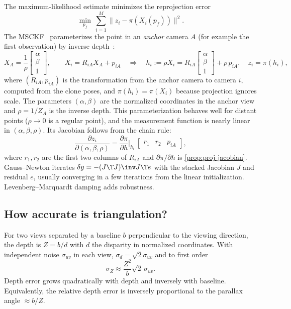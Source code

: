 The maximum-likelihood estimate minimizes the reprojection error
\begin{equation}
  \min_{p_f}\ \sum_{i=1}^M \big\| z_i - \pi(X_i(p_f)) \big\|^2 .
\end{equation}
The MSCKF~\cite{mourikis2007msckf} parameterizes the point in an \emph{anchor} camera $A$ (for example the first observation)
by inverse depth~\cite{civera2008inverse}:
\begin{equation}
  X_A = \frac1\rho\begin{bmatrix} \alpha \\ \beta \\ 1 \end{bmatrix}, \qquad
  X_i = R_{iA}X_A + p_{iA}
  \quad\Longrightarrow\quad
  h_i := \rho X_i = R_{iA}\begin{bmatrix}\alpha\\ \beta\\ 1\end{bmatrix} + \rho\,p_{iA}, \quad z_i = \pi(h_i),
\end{equation}
where $(R_{iA}, p_{iA})$ is the transformation from the anchor camera to camera $i$, computed from the clone poses, and
$\pi(h_i) = \pi(X_i)$ because projection ignores scale. The parameters $(\alpha, \beta)$ are the normalized coordinates in
the anchor view and $\rho = 1/Z_A$ is the inverse depth. This parameterization behaves well for distant points
($\rho\to0$ is a regular point), and the measurement function is nearly linear in $(\alpha, \beta, \rho)$. Its Jacobian
follows from the chain rule:
\begin{equation}
  \frac{\partial z_i}{\partial(\alpha, \beta, \rho)} = \frac{\partial\pi}{\partial h}\Big|_{h_i}\,
  \begin{bmatrix} r_1 & r_2 & p_{iA} \end{bmatrix},
\end{equation}
where $r_1, r_2$ are the first two columns of $R_{iA}$ and $\partial\pi/\partial h$ is \cref{prop:proj-jacobian}. Gauss--Newton
iterates $\delta y = -(J\T J)\inv J\T e$ with the stacked Jacobian $J$ and residual $e$, usually converging in a few
iterations from the linear initialization. Levenberg--Marquardt damping adds robustness.

\subsection{How accurate is triangulation?}

For two views separated by a baseline $b$ perpendicular to the viewing direction, the depth is $Z = b/d$ with $d$ the
disparity in normalized coordinates. With independent noise $\sigma_{uv}$ in each view, $\sigma_d = \sqrt2\sigma_{uv}$ and to first
order
\begin{equation}
  \sigma_Z \approx \frac{Z^2}{b}\sqrt2\,\sigma_{uv} .
  \label{eq:depth-sigma}
\end{equation}
Depth error grows quadratically with depth and inversely with baseline. Equivalently, the relative depth error is
inversely proportional to the parallax angle $\approx b/Z$.

